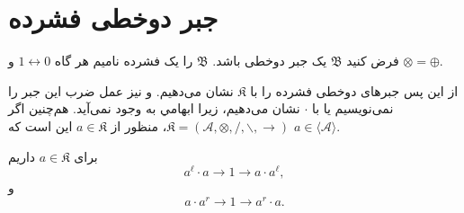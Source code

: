 \section{جبر دوخطی فشرده}

\begin{definition}
فرض کنید
$\mathfrak{B}$
یک جبر دوخطی باشد.
$\mathfrak{B}$
را یک فشرده نامیم هر گاه 
$1 \leftrightarrow 0$
و
$\otimes = \oplus$.
\end{definition}

\begin{contract}
از این پس جبرهای دوخطی فشرده را با
$\mathfrak{K}$
نشان می‌دهیم.
و نیز عمل ضرب این جبر را نمی‌نویسیم یا با 
$\cdot$
نشان می‌دهیم، زیرا ابهامي به وجود نمی‌آید.
هم‌چنین اگر
$\mathfrak{K} = (\mathcal{A}, \otimes, /, \backslash, \rightarrow)$،
منظور از
$a \in \mathfrak{K}$
این است که
$a \in \langle \mathcal{A} \rangle$.
\end{contract}

\begin{theorem}
برای
$a \in \mathfrak{K}$
داریم
\[ a^\ell \cdot a \rightarrow 1 \rightarrow a \cdot a^\ell, \]
و
\[ a \cdot a^r \rightarrow 1 \rightarrow a^r \cdot a. \]
\end{theorem}
